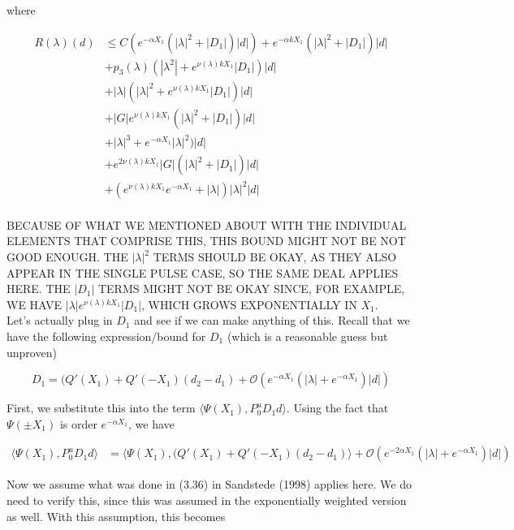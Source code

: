 \documentclass[12pt]{article}
\begin{document}
\begin{enumerate}
where

\begin{align*}
R(\lambda)(d) &\leq C( e^{-\alpha X_1}( |\lambda|^2 + |D_1|)|d|) + e^{-\alpha k X_1} ( |\lambda|^2 + |D_1|) |d| \\
&+ p_3(\lambda) (|\lambda^2| + e^{\nu(\lambda)k X_1}|D_1|)|d| \\
&+ |\lambda| (|\lambda|^2 + e^{\nu(\lambda)k X_1} |D_1|)|d| \\
&+ |G| e^{\nu(\lambda)k X_1} ( |\lambda|^2 + |D_1| )|d| \\ 
&+ |\lambda|^3 + e^{-\alpha X_1} |\lambda|^2 )|d| \\
&+ e^{2 \nu(\lambda) k X_1} |G| ( |\lambda|^2 + |D_1| )|d| \\
&+ (e^{\nu(\lambda)k X_1} e^{-\alpha X_1} + |\lambda|)|\lambda|^2|d|\\
\end{align*}

BECAUSE OF WHAT WE MENTIONED ABOUT WITH THE INDIVIDUAL ELEMENTS THAT COMPRISE THIS, THIS BOUND MIGHT NOT BE NOT GOOD ENOUGH. THE $|\lambda|^2$ TERMS SHOULD BE OKAY, AS THEY ALSO APPEAR IN THE SINGLE PULSE CASE, SO THE SAME DEAL APPLIES HERE. THE $|D_1|$ TERMS MIGHT NOT BE OKAY SINCE, FOR EXAMPLE, WE HAVE $|\lambda| e^{\nu(\lambda)k X_1} |D_1|$, WHICH GROWS EXPONENTIALLY IN $X_1$.\\

Let's actually plug in $D_1$ and see if we can make anything of this. Recall that we have the following expression/bound for $D_1$ (which is a reasonable guess but unproven)

\[
D_1 = ( Q'(X_1) + Q'(-X_1 )(d_2 - d_1) + \mathcal{O} \left( e^{-\alpha X_1} \left( |\lambda| +  e^{-\alpha X_1}  \right) |d| \right)
\]

First, we substitute this into the term $\langle \Psi(X_1), P^u_0 D_1 d \rangle$. Using the fact that $\Psi(\pm X_1)$ is order $e^{-\alpha X_1}$, we have

\begin{align*}
\langle \Psi(X_1), P^u_0 D_1 d \rangle &= \langle \Psi(X_1), (Q'(X_1) + Q'(-X_1 )(d_2 - d_1 ) \rangle + \mathcal{O} \left( e^{-2 \alpha X_1} \left( |\lambda| +  e^{-\alpha X_1}  \right) |d| \right)
\end{align*}

Now we assume what was done in (3.36) in Sandstede (1998) applies here. We do need to verify this, since this was assumed in the exponentially weighted version as well. With this assumption, this becomes


\end{enumerate}
\end{document}
